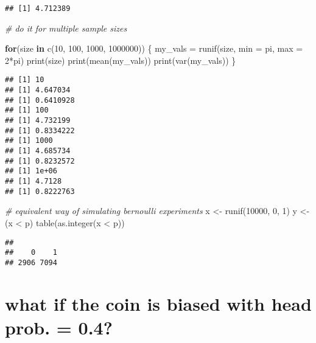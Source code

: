 \documentclass[
]{article}
\newenvironment{Shaded}{\begin{snugshade}}{\end{snugshade}}
\newcommand{\AttributeTok}[1]{\textcolor[rgb]{0.77,0.63,0.00}{#1}}
\newcommand{\CommentTok}[1]{\textcolor[rgb]{0.56,0.35,0.01}{\textit{#1}}}
\newcommand{\ControlFlowTok}[1]{\textcolor[rgb]{0.13,0.29,0.53}{\textbf{#1}}}
\newcommand{\DecValTok}[1]{\textcolor[rgb]{0.00,0.00,0.81}{#1}}
\newcommand{\FunctionTok}[1]{\textcolor[rgb]{0.00,0.00,0.00}{#1}}
\newcommand{\NormalTok}[1]{#1}
\newcommand{\OtherTok}[1]{\textcolor[rgb]{0.56,0.35,0.01}{#1}}
\newcommand{\SpecialCharTok}[1]{\textcolor[rgb]{0.00,0.00,0.00}{#1}}
\begin{document}
\begin{verbatim}
## [1] 4.712389
\end{verbatim}

\begin{Shaded}
\begin{Highlighting}[]
\CommentTok{\# do it for multiple sample sizes}

\ControlFlowTok{for}\NormalTok{(size }\ControlFlowTok{in} \FunctionTok{c}\NormalTok{(}\DecValTok{10}\NormalTok{, }\DecValTok{100}\NormalTok{, }\DecValTok{1000}\NormalTok{, }\DecValTok{1000000}\NormalTok{)) \{}
\NormalTok{  my\_vals }\OtherTok{=} \FunctionTok{runif}\NormalTok{(size, }\AttributeTok{min =}\NormalTok{ pi, }\AttributeTok{max =} \DecValTok{2}\SpecialCharTok{*}\NormalTok{pi)}
  \FunctionTok{print}\NormalTok{(size)}
  \FunctionTok{print}\NormalTok{(}\FunctionTok{mean}\NormalTok{(my\_vals))}
  \FunctionTok{print}\NormalTok{(}\FunctionTok{var}\NormalTok{(my\_vals))}
\NormalTok{\}}
\end{Highlighting}
\end{Shaded}

\begin{verbatim}
## [1] 10
## [1] 4.647034
## [1] 0.6410928
## [1] 100
## [1] 4.732199
## [1] 0.8334222
## [1] 1000
## [1] 4.685734
## [1] 0.8232572
## [1] 1e+06
## [1] 4.7128
## [1] 0.8222763
\end{verbatim}

\begin{Shaded}
\begin{Highlighting}[]
\CommentTok{\# equivalent way of simulating bernoulli experiments}
\NormalTok{x }\OtherTok{\textless{}{-}} \FunctionTok{runif}\NormalTok{(}\DecValTok{10000}\NormalTok{, }\DecValTok{0}\NormalTok{, }\DecValTok{1}\NormalTok{)}
\NormalTok{y }\OtherTok{\textless{}{-}}\NormalTok{ (x }\SpecialCharTok{\textless{}}\NormalTok{ p)}
\FunctionTok{table}\NormalTok{(}\FunctionTok{as.integer}\NormalTok{(x }\SpecialCharTok{\textless{}}\NormalTok{ p))}
\end{Highlighting}
\end{Shaded}

\begin{verbatim}
## 
##    0    1 
## 2906 7094
\end{verbatim}

\hypertarget{what-if-the-coin-is-biased-with-head-prob.-0.4}{%
\section{what if the coin is biased with head prob. =
0.4?}\label{what-if-the-coin-is-biased-with-head-prob.-0.4}}
\end{document}

